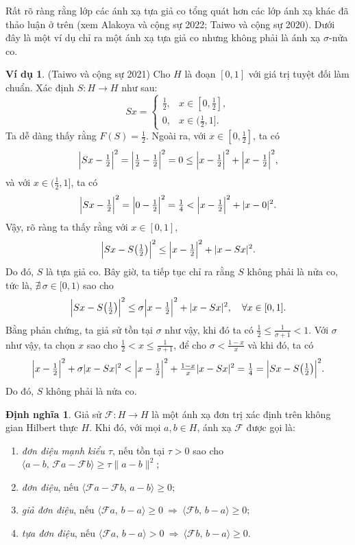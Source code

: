 \documentclass[11pt,a4paper]{article}
\theoremstyle{plain}
\theoremstyle{definition}
\newtheorem{definition}[theorem]{Định nghĩa}
\newtheorem{example}[theorem]{Ví dụ}
\theoremstyle{remark}
\numberwithin{equation}{section}
\newcommand{\Fc}{\mathcal{F}}
\newcommand{\inp}[2]{\langle #1,\,#2\rangle}
\newcommand{\nm}[1]{\lVert #1\rVert}
\newcommand{\abs}[1]{\lvert #1\rvert}
\newcommand{\Fix}[1]{F(#1)}
\begin{document}
Rất rõ ràng rằng lớp các ánh xạ tựa giả co tổng quát hơn các lớp ánh xạ khác đã thảo luận ở trên (xem Alakoya và cộng sự 2022; Taiwo và cộng sự 2020). Dưới đây là một ví dụ chỉ ra một ánh xạ tựa giả co nhưng không phải là ánh xạ $\sigma$-nửa co.

\begin{example}
(Taiwo và cộng sự 2021) Cho $H$ là đoạn $[0,1]$ với giá trị tuyệt đối làm chuẩn. Xác định $S:H\to H$ như sau:
\[
Sx=\begin{cases}\tfrac{1}{2}, & x\in[0,\tfrac{1}{2}],\\[2pt] 0, & x\in(\tfrac{1}{2},1].\end{cases}
\]
Ta dễ dàng thấy rằng $\Fix{S}=\tfrac{1}{2}$. Ngoài ra, với $x\in[0,\tfrac{1}{2}]$, ta có
\[
\Bigl\lvert Sx-\tfrac{1}{2}\Bigr\rvert^2=\Bigl\lvert\tfrac{1}{2}-\tfrac{1}{2}\Bigr\rvert^2=0\le\Bigl\lvert x-\tfrac{1}{2}\Bigr\rvert^2+\Bigl\lvert x-\tfrac{1}{2}\Bigr\rvert^2,
\]
và với $x\in(\tfrac{1}{2},1]$, ta có
\[
\Bigl\lvert Sx-\tfrac{1}{2}\Bigr\rvert^2=\Bigl\lvert 0-\tfrac{1}{2}\Bigr\rvert^2=\tfrac{1}{4}<\Bigl\lvert x-\tfrac{1}{2}\Bigr\rvert^2+\abs{x-0}^2.
\]
Vậy, rõ ràng ta thấy rằng với $x\in[0,1]$,
\[
\Bigl\lvert Sx-S\bigl(\tfrac{1}{2}\bigr)\Bigr\rvert^2\le\Bigl\lvert x-\tfrac{1}{2}\Bigr\rvert^2+\abs{x-Sx}^2.
\]
Do đó, $S$ là tựa giả co. Bây giờ, ta tiếp tục chỉ ra rằng $S$ không phải là nửa co, tức là, $\nexists\,\sigma\in[0,1)$ sao cho
\[
\Bigl\lvert Sx-S\bigl(\tfrac{1}{2}\bigr)\Bigr\rvert^2\le\sigma\Bigl\lvert x-\tfrac{1}{2}\Bigr\rvert^2+\abs{x-Sx}^2,\quad\forall x\in[0,1].
\]
Bằng phản chứng, ta giả sử tồn tại $\sigma$ như vậy, khi đó ta có $\tfrac{1}{2}\le\tfrac{1}{\sigma+1}<1$. Với $\sigma$ như vậy, ta chọn $x$ sao cho $\tfrac{1}{2}<x\le\tfrac{1}{\sigma+1}$, để cho $\sigma<\tfrac{1-x}{x}$ và khi đó, ta có
\[
\Bigl\lvert x-\tfrac{1}{2}\Bigr\rvert^2+\sigma\abs{x-Sx}^2<\Bigl\lvert x-\tfrac{1}{2}\Bigr\rvert^2+\tfrac{1-x}{x}\abs{x-Sx}^2=\tfrac{1}{4}=\Bigl\lvert Sx-S\bigl(\tfrac{1}{2}\bigr)\Bigr\rvert^2.
\]
Do đó, $S$ không phải là nửa co.
\end{example}

\begin{definition}
Giả sử $\Fc:H\to H$ là một ánh xạ đơn trị xác định trên không gian Hilbert thực $H$. Khi đó, với mọi $a,b\in H$, ánh xạ $\Fc$ được gọi là:
\begin{enumerate}[label=(\roman*)]
\item \textit{đơn điệu mạnh kiểu $\tau$}, nếu tồn tại $\tau>0$ sao cho $\inp{a-b}{\Fc a-\Fc b}\ge\tau\nm{a-b}^2$;
\item \textit{đơn điệu}, nếu $\inp{\Fc a-\Fc b}{a-b}\ge 0$;
\item \textit{giả đơn điệu}, nếu $\inp{\Fc a}{b-a}\ge 0\ \Longrightarrow\ \inp{\Fc b}{b-a}\ge 0$;
\item \textit{tựa đơn điệu}, nếu $\inp{\Fc a}{b-a}>0\ \Longrightarrow\ \inp{\Fc b}{b-a}\ge 0$.
\end{enumerate}
\end{definition}
\end{document}
